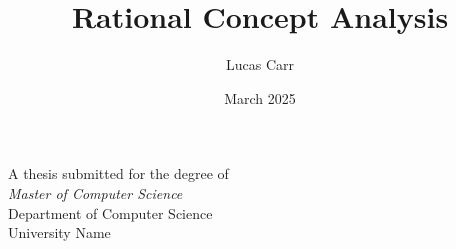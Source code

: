 \documentclass[10pt,a4paper]{report}
\title{Rational Concept Analysis}
\author{Lucas Carr}
\date{March 2025}
\begin{document}
\begin{titlepage}
  \centering
  \vspace*{4cm}
  {\Huge \bfseries \thetitle \par}
  \vspace{1.5cm}
  {\Large \theauthor \par}
  \vfill
  A thesis submitted for the degree of \\
  \textit{Master of Computer Science} \\
  Department of Computer Science \\
  University Name \\
  \vspace{1cm}
  \thedate
\end{titlepage}


% 
\tableofcontents
% 


% 
% 
% 
\printbibliography

\printindex
\end{document}
